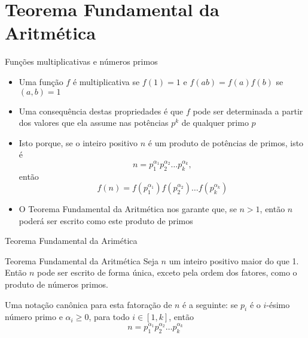 \section{Teorema Fundamental da Aritmética}

\begin{frame}[fragile]{Funções multiplicativas e números primos}

    \begin{itemize}
        \item Uma função $f$ é multiplicativa se $f(1) = 1$ e $f(ab) = f(a)f(b)$ se $(a, b) = 1$

        \item Uma consequência destas propriedades é que $f$ pode ser determinada a partir
            dos valores que ela assume nas potências $p^k$ de qualquer primo $p$

        \item Isto porque, se o inteiro positivo $n$ é um produto de potências de primos, isto é
        $$
            n = p_1^{\alpha_1}p_2^{\alpha_2}\ldots p_k^{\alpha_k},
        $$
        então
        $$
            f(n) = f(p_1^{\alpha_1})f(p_2^{\alpha_2})\ldots f(p_k^{\alpha_k})
        $$

        \item O Teorema Fundamental da Aritmética nos garante que, se $n > 1$, então $n$ poderá
            ser escrito como este produto de primos
    \end{itemize}

\end{frame}

\begin{frame}[fragile]{Teorema Fundamental da Arimética}

    \begin{block}{Teorema Fundamental da Aritmética}
        Seja $n$ um inteiro positivo maior do que 1. Então $n$ pode ser escrito de forma única,  
        exceto pela ordem dos fatores, como o produto de números primos.

        Uma notação canônica para esta fatoração de $n$ é a seguinte: se $p_i$ é o $i$-ésimo número 
        primo e $\alpha_i \geq 0$, para todo $i\in [1, k]$, então
        $$
            n = p_1^{\alpha_1}p_2^{\alpha_2}\ldots p_k^{\alpha_k}
        $$
    \end{block}

\end{frame}

